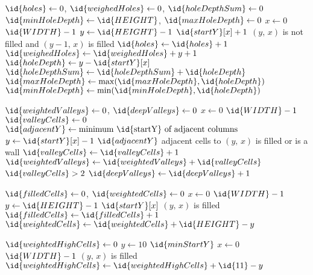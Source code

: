 \begin{codebox}
\li $\id{holes} \gets 0$, $\id{weighedHoles} \gets 0$, $\id{holeDepthSum} \gets 0$
\li $\id{minHoleDepth} \gets \id{HEIGHT}$, $\id{maxHoleDepth} \gets 0$
\li \For $x \gets 0$ \To $\id{WIDTH} - 1$ \Do
\li     \For $y \gets \id{HEIGHT} - 1$ \Downto $\id{startY}[x] + 1$ \Do
\li         \If $(y,\,x)$ is not filled and $(y-1,\,x)$ is filled \Then
\li             $\id{holes} \gets \id{holes} + 1$
\li             $\id{weighedHoles} \gets \id{weighedHoles} + y + 1$
\li             $\id{holeDepth} \gets y - \id{startY}[x]$
\li             $\id{holeDepthSum} \gets \id{holeDepthSum} + \id{holeDepth}$
\li             $\id{maxHoleDepth} \gets \max(\id{maxHoleDepth}, \id{holeDepth})$
\li             $\id{minHoleDepth} \gets \min(\id{minHoleDepth}, \id{holeDepth})$
            \End
        \End
    \End    
\end{codebox}

\begin{codebox}
\li $\id{weightedValleys} \gets 0$, $\id{deepValleys} \gets 0$
\li \For $x \gets 0$ \To $\id{WIDTH} - 1$ \Do
\li     $\id{valleyCells} \gets 0$
\li     $\id{adjacentY} \gets \mbox{minimum \id{startY} of adjacent columns}$
\li     \For $y \gets \id{startY}[x] - 1$ \Downto $\id{adjacentY}$ \Do
\li         \If adjacent cells to $(y,\,x)$ is filled or is a wall \Then
\li             $\id{valleyCells} \gets \id{valleyCells} + 1$
            \End
        \End
\li     $\id{weightedValleys} \gets \id{weightedValleys} + \id{valleyCells}$
\li     \If $\id{valleyCells} > 2$ \Then
\li         $\id{deepValleys} \gets \id{deepValleys} + 1$
        \End
    \End    
\end{codebox}

\begin{codebox}
\li $\id{filledCells} \gets 0$, $\id{weightedCells} \gets 0$
\li \For $x \gets 0$ \To $\id{WIDTH} - 1$ \Do
\li     \For $y \gets \id{HEIGHT} - 1$ \Downto $\id{startY}[x]$ \Do
\li         \If $(y,\,x)$ is filled \Then
\li             $\id{filledCells} \gets \id{filledCells} + 1$
\li             $\id{weightedCells} \gets \id{weightedCells} + \id{HEIGHT} - y$
            \End
        \End
    \End    
\end{codebox}

\begin{codebox}
\li $\id{weightedHighCells} \gets 0$
\li \For $y \gets 10$ \Downto $\id{minStartY}$ \Do
\li     \For $x \gets 0$ \To $\id{WIDTH} - 1$ \Do
\li         \If $(y,\,x)$ is filled \Then
\li             $\id{weightedHighCells} \gets \id{weightedHighCells} + \id{11} - y$
            \End
        \End
    \End    
\end{codebox}

